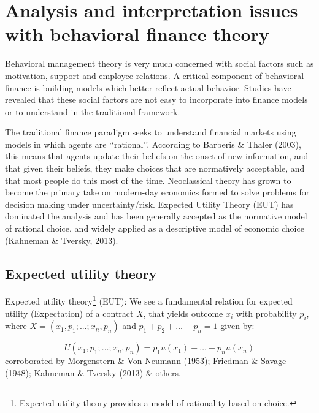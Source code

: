 \documentclass{DissertateUSU}
\begin{document}
\section{Analysis and interpretation issues with behavioral finance theory}
\label{sec:Analysis and interpretation issues with behavioral finance theory}

Behavioral management theory is very much concerned with social factors
such as motivation, support and employee relations. A critical component
of behavioral finance is building models which better reflect actual
behavior. Studies have revealed that these social factors are not easy
to incorporate into finance models or to understand in the traditional
framework.\medskip 

The traditional finance paradigm seeks to understand financial markets
using models in which agents are \lq\lq rational\rq\rq. According to
Barberis \& Thaler (2003), this means that agents update their beliefs
on the onset of new information, and that given their beliefs, they make
choices that are normatively acceptable, and that most people do this
most of the time. Neoclassical theory has grown to become the primary
take on modern-day economics formed to solve problems for decision
making under uncertainty/risk. Expected Utility Theory (EUT) has
dominated the analysis and has been generally accepted as the normative
model of rational choice, and widely applied as a descriptive model of
economic choice (Kahneman \& Tversky, 2013).

\subsection{Expected utility theory}
\label{ssec:Expected utility theory}

Expected utility
theory\footnote{Expected utility theory provides a model of rationality based on choice.}
(EUT): We see a fundamental relation for expected utility (Expectation)
of a contract \(X\), that yields outcome \(x_i\) with probability
\(p_i\), where \(X = (x_1,p_1; ...; x_n,p_n)\) and
\(p_1+p_2+\ldots+p_n=1\) given by:

\singlespacing

\begin{equation}\label{EUT_extended}
U(x_1,p_1;\ldots;x_n,p_n) = p_1u(x_1)+\ldots+p_nu(x_n) 
\end{equation} \doublespacing corroborated by Morgenstern \& Von Neumann
(1953); Friedman \& Savage (1948); Kahneman \& Tversky (2013) \& others.
\end{document}

